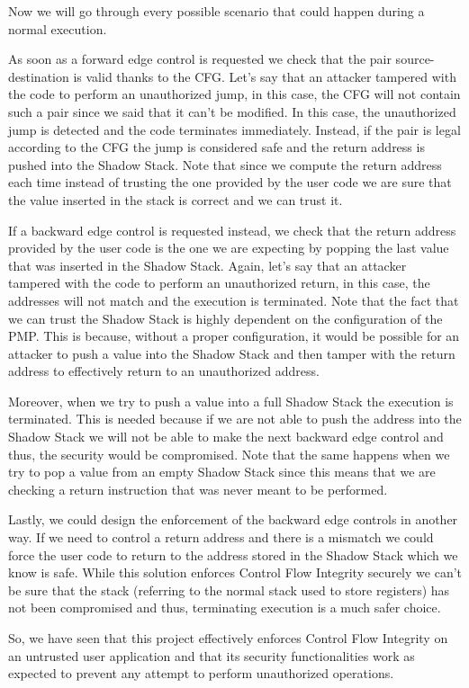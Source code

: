 Now we will go through every possible scenario that could happen during a normal
execution.

As soon as a forward edge control is requested we check that the pair source-destination
is valid thanks to the CFG. Let's say that an attacker tampered with the code to
perform an unauthorized jump, in this case, the CFG will not contain such a pair
since we said that it can't be modified. In this case, the unauthorized jump is detected
and the code terminates immediately. Instead, if the pair is legal according to the
CFG the jump is considered safe and the return address is pushed into the Shadow
Stack. Note that since we compute the return address each time instead of
trusting the one provided by the user code we are sure that the value inserted
in the stack is correct and we can trust it.

If a backward edge control is requested instead, we check that the return address
provided by the user code is the one we are expecting by popping the last value that
was inserted in the Shadow Stack. Again, let's say that an attacker tampered with
the code to perform an unauthorized return, in this case, the addresses will not
match and the execution is terminated. Note that the fact that we can trust the
Shadow Stack is highly dependent on the configuration of the PMP. This is because,
without a proper configuration, it would be possible for an attacker to push a value
into the Shadow Stack and then tamper with the return address to effectively return
to an unauthorized address.

Moreover, when we try to push a value into a full Shadow Stack the execution is
terminated. This is needed because if we are not able to push the address into the
Shadow Stack we will not be able to make the next backward edge control and thus,
the security would be compromised. Note that the same happens when we try to pop
a value from an empty Shadow Stack since this means that we are checking a return
instruction that was never meant to be performed.

Lastly, we could design the enforcement of the backward edge controls in another
way. If we need to control a return address and there is a mismatch we could force
the user code to return to the address stored in the Shadow Stack which we know is
safe. While this solution enforces Control Flow Integrity securely we can't be
sure that the stack (referring to the normal stack used to store registers) has
not been compromised and thus, terminating execution is a much safer choice.

So, we have seen that this project effectively enforces Control Flow Integrity
on an untrusted user application and that its security functionalities work as
expected to prevent any attempt to perform unauthorized operations.